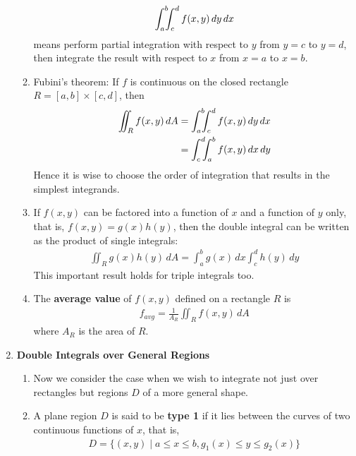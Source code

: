\documentclass[10pt]{article}
\begin{document}
\begin{multicols*}{2}
\begin{enumerate}
\begin{enumerate}
        \begin{align*}
            \int_a^b \hspace{-1.8mm}\int_c^d f(x,y) \,dy \,dx 
        \end{align*}
        means perform partial integration with respect to $y$ from $y=c$ to $y=d$, then integrate the result with respect to $x$ from $x=a$ to $x=b$.
        \item Fubini's theorem: If $f$ is continuous on the closed rectangle $R= [a,b] \times [c,d]$, then
        \begin{align*}
            \iint_R f(x,y) \,dA &= \int_a^b \hspace{-1.8mm} \int_c^d f(x,y) \,dy \,dx \\ &= \int_c^d \hspace{-1.8mm} \int_a^b f(x,y) \,dx \,dy
        \end{align*}
        Hence it is wise to choose the order of integration that results in the simplest integrands.
        \item If $f(x,y)$ can be factored into a function of $x$ and a function of $y$ only, that is, $f(x,y) = g(x)h(y)$, then the double integral can be written as the product of single integrals:
        \begin{align*}
            \iint_R g(x)h(y) \,dA = \int_a^b g(x) \,dx \int_c^d h(y) \,dy
        \end{align*}
        This important result holds for triple integrals too.
        \item The \textbf{average value} of $f(x,y)$ defined on a rectangle $R$ is 
        \begin{align*}
            f_{avg} = \frac{1}{A_R} \iint_R f(x,y) \,dA
        \end{align*}
        where $A_R$ is the area of $R$.
    \end{enumerate}
    \item \textbf{Double Integrals over General Regions}
    \begin{enumerate} 
        \item Now we consider the case when we wish to integrate not just over rectangles but regions $D$ of a more general shape. 
        \item A plane region $D$ is said to be \textbf{type 1} if it lies between the curves of two continuous functions of $x$, that is,
        \begin{align*}
            D = \{(x,y) \mid a \leq x \leq b, g_1(x) \leq y \leq g_2(x) \}
        \end{align*}

\end{enumerate}
\end{enumerate}
\end{multicols*}
\end{document}
